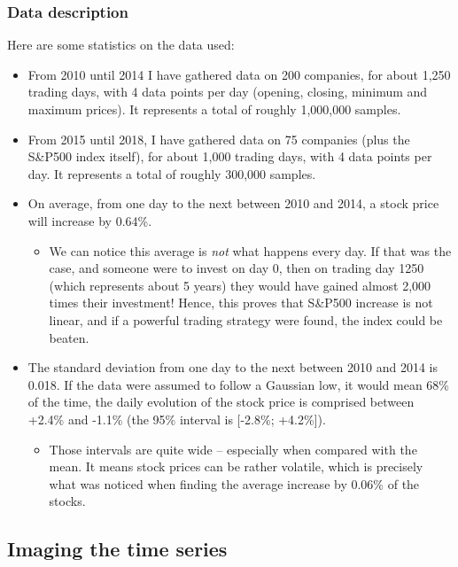 \documentclass[11pt]{article}
\begin{document}
\begin{onehalfspace}
\subsubsection{Data description}
Here are some statistics on the data used:

\begin{itemize}
    \item From 2010 until 2014 I have gathered data on 200 companies, for about 1,250 trading days, with 4 data points per day (opening, closing, minimum and maximum prices). It represents a total of roughly 1,000,000 samples.
    
    \item From 2015 until 2018, I have gathered data on 75 companies (plus the S\&P500 index itself), for about 1,000 trading days, with 4 data points per day. It represents a total of roughly 300,000 samples.
    
    \item On average, from one day to the next between 2010 and 2014, a stock price will increase by 0.64\%.
    \begin{itemize}
        \item We can notice this average is \emph{not} what happens every day. If that was the case, and someone were to invest on day 0, then on trading day 1250 (which represents about 5 years) they would have gained almost 2,000 times their investment! Hence, this proves that S\&P500 increase is not linear, and if a powerful trading strategy were found, the index could be beaten.
    \end{itemize}

    \item The standard deviation from one day to the next between 2010 and 2014 is 0.018. If the data were assumed to follow a Gaussian low, it would mean 68\% of the time, the daily evolution of the stock price is comprised between +2.4\% and -1.1\% (the 95\% interval is [-2.8\%; +4.2\%]).
    \begin{itemize}
        \item Those intervals are quite wide -- especially when compared with the mean. It means stock prices can be rather volatile, which is precisely what was noticed when finding the average increase by 0.06\% of the stocks.
    \end{itemize}
\end{itemize}



\subsection{Imaging the time series}


\end{onehalfspace}
\end{document}
